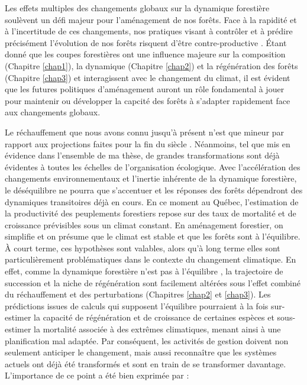 Les effets multiples des changements globaux sur la dynamique forestière
soulèvent un défi majeur pour l'aménagement de nos forêts. Face à la
rapidité et à l'incertitude de ces changements, nos pratiques visant à
contrôler et à prédire précisément l'évolution de nos forêts risquent
d'être contre-productive \citep{puettmann_critique_2009}. Étant donné
que les coupes forestières ont une influence majeure sur la composition
(Chapitre \ref{chap1}), la dynamique (Chapitre \ref{chap2}) et la
régénération des forêts (Chapitre \ref{chap3}) et interagissent avec le
changement du climat, il est évident que les futures politiques
d'aménagement auront un rôle fondamental à jouer pour maintenir ou
développer la capcité des forêts à s'adapter rapidement face aux
changements globaux.

Le réchauffement que nous avons connu jusqu'à présent n'est que mineur
par rapport aux projections faites pour la fin du siècle
\citep{ipcc_climate_2014}. Néanmoins, tel que mis en évidence dans
l'ensemble de ma thèse, de grandes transformations sont déjà évidentes à
toutes les échelles de l'organisation écologique. Avec l'accélération
des changements environnementaux et l'inertie inhérente de la dynamique
forestière, le déséquilibre ne pourra que s'accentuer et les réponses
des forêts dépendront des dynamiques transitoires déjà en cours. En ce
moment au Québec, l'estimation de la productivité des peuplements
forestiers repose sur des taux de mortalité et de croissance prévisibles
sous un climat constant. En aménagement forestier, on simplifie et on
présume que le climat est stable et que les forêts sont à l'équilibre. À
court terme, ces hypothèses sont valables, alors qu'à long terme elles
sont particulièrement problématiques dans le contexte du changement
climatique. En effet, comme la dynamique forestière n'est pas à
l'équilibre \citep{talluto_extinction_2017}, la trajectoire de
succession et la niche de régénération sont facilement altérées sous
l'effet combiné du réchauffement et des perturbations (Chapitres
\ref{chap2} et \ref{chap3}). Les prédictions issues de calculs qui
supposent l'équilibre pourraient à la fois sur-estimer la capacité de
régénération et de croissance de certaines espèces et sous-estimer la
mortalité associée à des extrêmes climatiques, menant ainsi à une
planification mal adaptée. Par conséquent, les activités de gestion
doivent non seulement anticiper le changement, mais aussi reconnaître
que les systèmes actuels ont déjà été transformés et sont en train de se
transformer davantage. L'importance de ce point a été bien exprimée par
\citet{seastedt_management_2008} :

